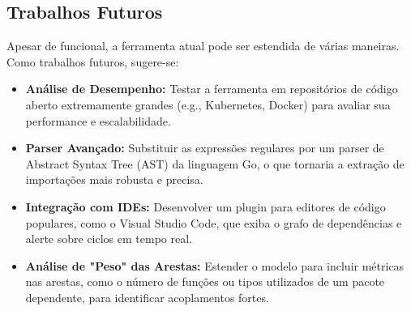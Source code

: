\documentclass[12pt]{article}
\begin{document}
\subsection{Trabalhos Futuros}
Apesar de funcional, a ferramenta atual pode ser estendida de várias maneiras. Como trabalhos futuros, sugere-se:
\begin{itemize}
    \item \textbf{Análise de Desempenho:} Testar a ferramenta em repositórios de código aberto extremamente grandes (e.g., Kubernetes, Docker) para avaliar sua performance e escalabilidade.
    \item \textbf{Parser Avançado:} Substituir as expressões regulares por um parser de Abstract Syntax Tree (AST) da linguagem Go, o que tornaria a extração de importações mais robusta e precisa.
    \item \textbf{Integração com IDEs:} Desenvolver um plugin para editores de código populares, como o Visual Studio Code, que exiba o grafo de dependências e alerte sobre ciclos em tempo real.
    \item \textbf{Análise de "Peso" das Arestas:} Estender o modelo para incluir métricas nas arestas, como o número de funções ou tipos utilizados de um pacote dependente, para identificar acoplamentos fortes.
\end{itemize}



\end{document}
